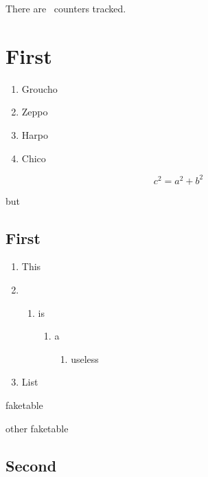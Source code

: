 \documentclass[verbose]{scrbook}
\begin{document}
\begin{tcolorbox}[title={Document statistics for demonstration},colbacktitle=red,coltitle=black]
There are \numberofstoredcounters\ counters tracked. 

  \Fullstatistics
\end{tcolorbox}

\tableofcontents
\listoffigures
\listoftables


\chapter{First}
\ShowStatistics[1]

\begin{enumerate}
\item Groucho
\item Zeppo
\item Harpo
\item Chico
\end{enumerate}

\begin{equation}
  c^2 = a^2 + b^2 
\end{equation}

but

\ShowStatistics[4]
\section{First}


\begin{enumerate}
\item This 
\item \begin{enumerate}
  \item is
    \begin{enumerate}
    \item a 
      \begin{enumerate}
      \item useless
      \end{enumerate}
    \end{enumerate}
  \end{enumerate}
\item List \theenumiv
\end{enumerate}




\begin{table}
\caption{faketable}
\caption{other faketable}

\end{table}
\section{Second}
\end{document}
